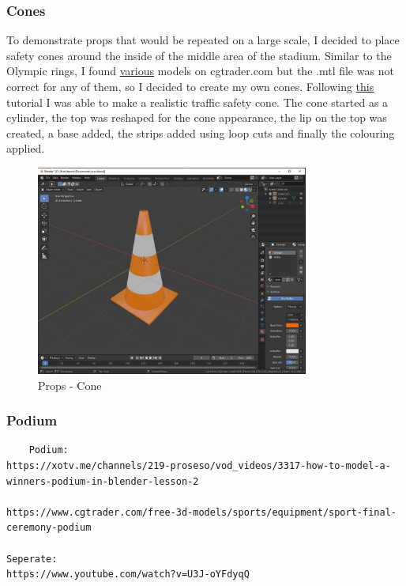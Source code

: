 \documentclass[a4 paper, 12pt]{article}
\begin{document}
\subsubsection{Cones}
To demonstrate props that would be repeated on a large scale, I decided to place safety cones around the inside of the middle area of the stadium. Similar to the Olympic rings, I found \href{https://www.cgtrader.com/free-3d-models/exterior/street/cone-2b4a9172-7afb-4611-8e23-bdac1afe0b87}{various} models on cgtrader.com but the .mtl file was not correct for any of them, so I decided to create my own cones. Following \href{https://www.youtube.com/watch?v=vQ_1HU_-BJM}{this} tutorial I was able to make a realistic traffic safety cone. The cone started as a cylinder, the top was reshaped for the cone appearance, the lip on the top was created, a base added, the strips added using loop cuts and finally the colouring applied.
    \begin{figure} [H]
        \centering
        \includegraphics[width=0.8\textwidth, frame]
            {./images/olympics/cone_blend.jpg}
        \caption{Props - Cone}   
    \end{figure}


\subsubsection{Podium}
\begin{lstlisting}
    Podium:
https://xotv.me/channels/219-proseso/vod_videos/3317-how-to-model-a-winners-podium-in-blender-lesson-2 

https://www.cgtrader.com/free-3d-models/sports/equipment/sport-final-ceremony-podium

Seperate:
https://www.youtube.com/watch?v=U3J-oYFdyqQ
\end{lstlisting}
\end{document}
